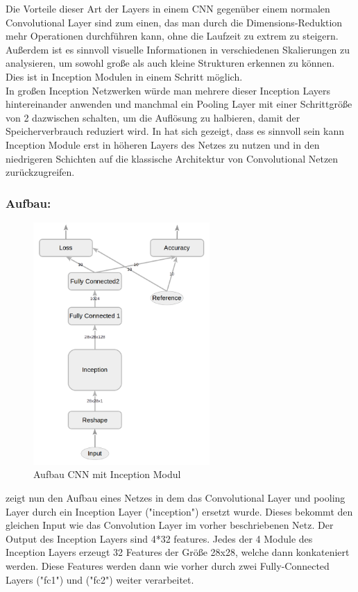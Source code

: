 \documentclass[runningheads,a4paper]{llncs}[2015/06/24]
\begin{document}
Die Vorteile dieser Art der Layers in einem CNN gegenüber einem normalen Convolutional Layer sind zum einen, das man durch die Dimensions-Reduktion mehr Operationen durchführen kann, ohne die Laufzeit zu extrem zu steigern. Außerdem ist es sinnvoll visuelle Informationen in verschiedenen Skalierungen zu analysieren, um sowohl große als auch kleine Strukturen erkennen zu können. Dies ist in Inception Modulen in einem Schritt möglich.\\
In großen Inception Netzwerken würde man mehrere dieser Inception Layers hintereinander anwenden und manchmal ein Pooling Layer mit einer Schrittgröße von 2 dazwischen schalten, um die Auflösung zu halbieren, damit der Speicherverbrauch reduziert wird. In \cite{inception_paper} hat sich gezeigt, dass es sinnvoll sein kann Inception Module erst in höheren Layers des Netzes zu nutzen und in den niedrigeren Schichten auf die klassische Architektur von Convolutional Netzen zurückzugreifen.

\subsubsection*{Aufbau:}
\begin{figure}
	\centering
	\includegraphics[width=0.6\textwidth]{images/main_graph_inception_reduced.png}
	\caption{Aufbau CNN mit Inception Modul}
	\label{fig:main_graph_inception}
\end{figure}
 zeigt nun den Aufbau eines Netzes in dem das Convolutional Layer und pooling Layer durch ein Inception Layer ("inception") ersetzt wurde. Dieses bekommt den gleichen Input wie das Convolution Layer im vorher beschriebenen Netz. Der Output des Inception Layers sind 4*32 features. Jedes der 4 Module des Inception Layers erzeugt 32 Features der Größe 28x28, welche dann konkateniert werden. Diese Features werden dann wie vorher durch zwei Fully-Connected Layers ("fc1") und ("fc2") weiter verarbeitet.
\end{document}
